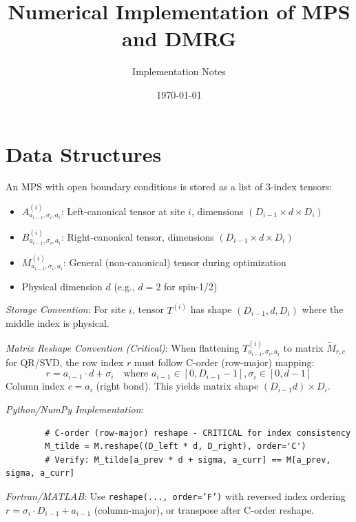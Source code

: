 \documentclass[aps,prb,onecolumn,scriptaddress]{revtex4-2}
\begin{document}
	
	\title{Numerical Implementation of MPS and DMRG}
	\author{Implementation Notes}
	\date{\today}
	\maketitle
	
	\section{Data Structures}
	
	An MPS with open boundary conditions is stored as a list of 3-index tensors:
	\begin{itemize}
		\item $A^{(i)}_{a_{i-1},\sigma_i,a_i}$: Left-canonical tensor at site $i$, dimensions $(D_{i-1} \times d \times D_i)$
		\item $B^{(i)}_{a_{i-1},\sigma_i,a_i}$: Right-canonical tensor, dimensions $(D_{i-1} \times d \times D_i)$  
		\item $M^{(i)}_{a_{i-1},\sigma_i,a_i}$: General (non-canonical) tensor during optimization
		\item Physical dimension $d$ (e.g., $d=2$ for spin-1/2)
	\end{itemize}
	
	\textit{Storage Convention}: For site $i$, tensor $T^{(i)}$ has shape $(D_{i-1}, d, D_i)$ where the middle index is physical.
	
	\textit{Matrix Reshape Convention (Critical)}: When flattening $T^{(i)}_{a_{i-1},\sigma_i,a_i}$ to matrix $\tilde{M}_{r,c}$ for QR/SVD, the row index $r$ must follow C-order (row-major) mapping:
	\begin{equation}
		r = a_{i-1} \cdot d + \sigma_i \quad \text{where } a_{i-1} \in [0,D_{i-1}-1], \sigma_i \in [0,d-1]
	\end{equation}
	Column index $c = a_i$ (right bond). This yields matrix shape $(D_{i-1}d) \times D_i$.
	
	\textit{Python/NumPy Implementation}:
	\begin{verbatim}
		# C-order (row-major) reshape - CRITICAL for index consistency
		M_tilde = M.reshape((D_left * d, D_right), order='C')
		# Verify: M_tilde[a_prev * d + sigma, a_curr] == M[a_prev, sigma, a_curr]
	\end{verbatim}
	\textit{Fortran/MATLAB}: Use \texttt{reshape(..., order='F')} with reversed index ordering $r = \sigma_i \cdot D_{i-1} + a_{i-1}$ (column-major), or transpose after C-order reshape.
	
\end{document}
